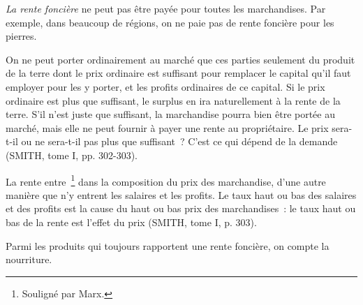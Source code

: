 \documentclass[french,twoside]{book} %
\newenvironment{quoteblock}%
  {\begin{quoting}}
  {\end{quoting}}
\newenvironment{quotebar}{%
    \def\FrameCommand{{\color{rubric!10!}\vrule width 0.5em} \hspace{0.9em}}%
    \def\OuterFrameSep{\itemsep} %
    \MakeFramed {\advance\hsize-\width \FrameRestore}
  }%
  {%
    \endMakeFramed
  }
\renewenvironment{quoteblock}%
  {%
    \savenotes
    \setstretch{0.9}
    \normalfont
    \begin{quotebar}
  }
  {%
    \end{quotebar}
    \spewnotes
  }
\begin{document}
\noindent \emph{La rente foncière} ne peut pas être payée pour toutes les marchandises. Par exemple, dans beaucoup de régions, on ne paie pas de rente foncière pour les pierres.\par

\begin{quoteblock}
 \noindent On ne peut porter ordinairement au marché que ces parties seulement du produit de la terre dont le prix ordinaire est suffisant pour remplacer le capital qu’il faut employer pour les y porter, et les profits ordinaires de ce capital. Si le prix ordinaire est plus que suffisant, le surplus en ira naturellement à la rente de la terre. S’il n’est juste que suffisant, la marchandise pourra bien être portée au marché, mais elle ne peut fournir à payer une rente au propriétaire. Le prix sera-t-il ou ne sera-t-il pas plus que suffisant ? C’est ce qui dépend de la demande (SMITH, tome I, pp. 302-303).
 \end{quoteblock}

\noindent La rente entre \footnote{Souligné par Marx.} dans la composition du prix des marchandise, d’une autre manière que n’y entrent les salaires et les profits. Le taux haut ou bas des salaires et des profits est la cause du haut ou bas prix des marchandises : le taux haut ou bas de la rente est l’effet du prix (SMITH, tome I, p. 303).\par
Parmi les produits qui toujours rapportent une rente foncière, on compte la nourriture.\par
\end{document}
